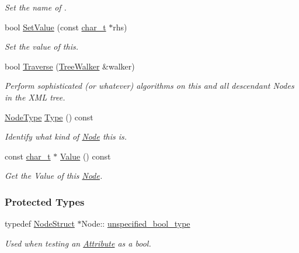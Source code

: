 \begin{DoxyCompactItemize}
\begin{DoxyCompactList}\small\item\em Set the name of . \item\end{DoxyCompactList}\item 
bool \hyperlink{classphys_1_1xml_1_1Node_a50ff9948dac721339561ed3442fb7034}{SetValue} (const \hyperlink{namespacephys_1_1xml_afc87705cd1c2917d87b879715a2d8f6e}{char\_\-t} $\ast$rhs)
\begin{DoxyCompactList}\small\item\em Set the value of this. \item\end{DoxyCompactList}\item 
bool \hyperlink{classphys_1_1xml_1_1Node_a0029d08d3689c36d882ada0c0c9cf6e9}{Traverse} (\hyperlink{classphys_1_1xml_1_1TreeWalker}{TreeWalker} \&walker)
\begin{DoxyCompactList}\small\item\em Perform sophisticated (or whatever) algorithms on this and all descendant Nodes in the XML tree. \item\end{DoxyCompactList}\item 
\hyperlink{namespacephys_1_1xml_a668b0cc666a9d49f7c7222a7552115d3}{NodeType} \hyperlink{classphys_1_1xml_1_1Node_a33288f89218baf24d1061c6eeb08687f}{Type} () const 
\begin{DoxyCompactList}\small\item\em Identify what kind of \hyperlink{classphys_1_1xml_1_1Node}{Node} this is. \item\end{DoxyCompactList}\item 
const \hyperlink{namespacephys_1_1xml_afc87705cd1c2917d87b879715a2d8f6e}{char\_\-t} $\ast$ \hyperlink{classphys_1_1xml_1_1Node_a90e8efb31007ade54d62c1752979461f}{Value} () const 
\begin{DoxyCompactList}\small\item\em Get the Value of this \hyperlink{classphys_1_1xml_1_1Node}{Node}. \item\end{DoxyCompactList}\end{DoxyCompactItemize}
\subsubsection*{Protected Types}
\begin{DoxyCompactItemize}
\item 
\hypertarget{classphys_1_1xml_1_1Node_a038a36ae32b13b5da7882099bba139fb}{
typedef \hyperlink{classNodeStruct}{NodeStruct} $\ast$Node:: \hyperlink{classphys_1_1xml_1_1Node_a038a36ae32b13b5da7882099bba139fb}{unspecified\_\-bool\_\-type}}
\label{classphys_1_1xml_1_1Node_a038a36ae32b13b5da7882099bba139fb}

\begin{DoxyCompactList}\small\item\em Used when testing an \hyperlink{classphys_1_1xml_1_1Attribute}{Attribute} as a bool. \item\end{DoxyCompactList}\end{DoxyCompactItemize}
